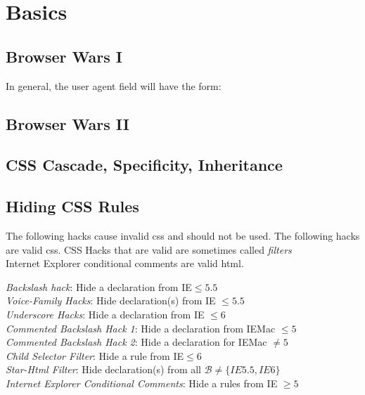 \chapter{Basics}


\section{Browser Wars I}



In general, the user agent field will have the form:

\section{Browser Wars II}





\section{CSS Cascade, Specificity, Inheritance}






\section{Hiding CSS Rules}





The following hacks cause invalid css and should not be used. 
The following hacks are valid css. 
CSS Hacks that are valid are sometimes called \textit{filters}\\
Internet Explorer conditional comments are valid html. 

\textit{Backslash hack}: Hide a declaration from IE$\leqslant 5.5$\\
\textit{Voice-Family Hacks}: Hide declaration(s) from IE $\leqslant 5.5$\\
\textit{Underscore Hacks}: Hide a declaration from IE $\leqslant 6$\\
\textit{Commented Backslash Hack 1}: Hide a declaration from IEMac $\leqslant 5$\\
\textit{Commented Backslash Hack 2}: Hide a declaration for IEMac $\neq 5$\\
\textit{Child Selector Filter}: Hide a rule from IE$\leqslant 6$\\
\textit{Star-Html Filter}: Hide declaration(s) from all $\mathcal{B} \neq \{IE5.5,IE6\}$\\
\textit{Internet Explorer Conditional Comments}: Hide a rules from IE $\geqslant 5$\\





